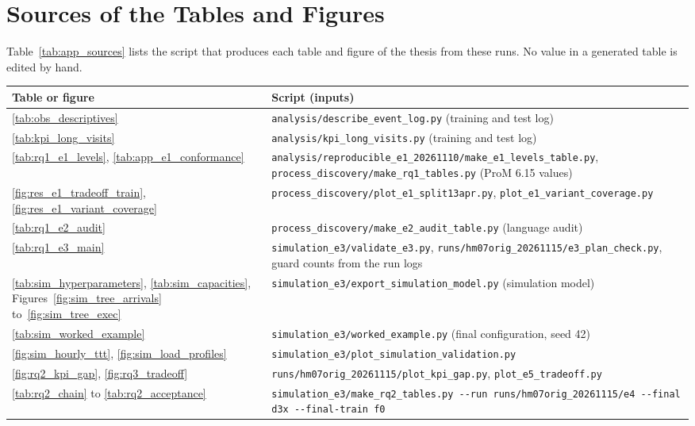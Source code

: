 \section{Sources of the Tables and Figures}

Table~\ref{tab:app_sources} lists the script that produces each table and figure
of the thesis from these runs. No value in a generated table is edited by hand.

\begin{table}[htbp]
\centering
\scriptsize
\begin{tabularx}{\textwidth}{L{4.6cm}Y}
\toprule
\textbf{Table or figure} & \textbf{Script (inputs)} \\
\midrule
\ref{tab:obs_descriptives} & \nolinkurl{analysis/describe_event_log.py} (training and test log) \\
\ref{tab:kpi_long_visits} & \nolinkurl{analysis/kpi_long_visits.py} (training and test log) \\
\ref{tab:rq1_e1_levels}, \ref{tab:app_e1_conformance} & \nolinkurl{analysis/reproducible_e1_20261110/make_e1_levels_table.py}, \nolinkurl{process_discovery/make_rq1_tables.py} (ProM 6.15 values) \\
\ref{fig:res_e1_tradeoff_train}, \ref{fig:res_e1_variant_coverage} & \nolinkurl{process_discovery/plot_e1_split13apr.py}, \nolinkurl{plot_e1_variant_coverage.py} \\
\ref{tab:rq1_e2_audit} & \nolinkurl{process_discovery/make_e2_audit_table.py} (language audit) \\
\ref{tab:rq1_e3_main} & \nolinkurl{simulation_e3/validate_e3.py}, \nolinkurl{runs/hm07orig_20261115/e3_plan_check.py}, guard counts from the run logs \\
\ref{tab:sim_hyperparameters}, \ref{tab:sim_capacities}, Figures~\ref{fig:sim_tree_arrivals} to~\ref{fig:sim_tree_exec} & \nolinkurl{simulation_e3/export_simulation_model.py} (simulation model) \\
\ref{tab:sim_worked_example} & \nolinkurl{simulation_e3/worked_example.py} (final configuration, seed 42) \\
\ref{fig:sim_hourly_ttt}, \ref{fig:sim_load_profiles} & \nolinkurl{simulation_e3/plot_simulation_validation.py} \\
\ref{fig:rq2_kpi_gap}, \ref{fig:rq3_tradeoff} & \nolinkurl{runs/hm07orig_20261115/plot_kpi_gap.py}, \nolinkurl{plot_e5_tradeoff.py} \\
\ref{tab:rq2_chain} to \ref{tab:rq2_acceptance} & \nolinkurl{simulation_e3/make_rq2_tables.py --run runs/hm07orig_20261115/e4 --final d3x --final-train f0} \\

\end{tabularx}
\end{table}
